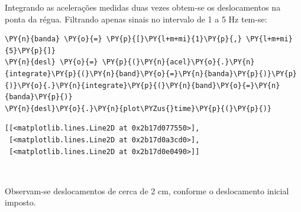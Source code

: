 Integrando as acelerações medidas duas vezes obtem-se os deslocamentos
na ponta da régua. Filtrando apenas sinais no intervalo de 1 a 5 Hz
tem-se:

    \begin{tcolorbox}[breakable, size=fbox, boxrule=1pt, pad at break*=1mm,colback=cellbackground, colframe=cellborder]
\begin{Verbatim}[commandchars=\\\{\}]
\PY{n}{banda} \PY{o}{=} \PY{p}{[}\PY{l+m+mi}{1}\PY{p}{,} \PY{l+m+mi}{5}\PY{p}{]}
\PY{n}{desl} \PY{o}{=} \PY{p}{(}\PY{n}{acel}\PY{o}{.}\PY{n}{integrate}\PY{p}{(}\PY{n}{band}\PY{o}{=}\PY{n}{banda}\PY{p}{)}\PY{p}{)}\PY{o}{.}\PY{n}{integrate}\PY{p}{(}\PY{n}{band}\PY{o}{=}\PY{n}{banda}\PY{p}{)}
\PY{n}{desl}\PY{o}{.}\PY{n}{plot\PYZus{}time}\PY{p}{(}\PY{p}{)}
\end{Verbatim}
\end{tcolorbox}

            \begin{tcolorbox}[breakable, size=fbox, boxrule=.5pt, pad at break*=1mm, opacityfill=0]
\begin{Verbatim}[commandchars=\\\{\}]
[[<matplotlib.lines.Line2D at 0x2b17d077550>],
 [<matplotlib.lines.Line2D at 0x2b17d0a3cd0>],
 [<matplotlib.lines.Line2D at 0x2b17d0e0490>]]
\end{Verbatim}
\end{tcolorbox}
        
    \begin{center}
    \end{center}
    { \hspace*{\fill} \\}
    
    Observam-se deslocamentos de cerca de 2 cm, conforme o deslocamento
inicial imposto.


    
    
    

